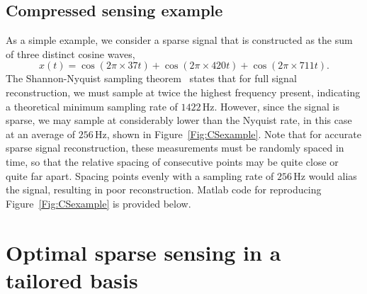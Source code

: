 \documentclass[letterpaper]{IEEEtran}
\begin{document}
\subsection[Compressed sensing example]{Compressed sensing example}
\label{sb:cs_example}
As a simple example, we consider a sparse signal that is constructed as the sum of three distinct cosine waves,
%
\begin{equation}
x(t) = \cos(2\pi\times 37 t) +  \cos(2\pi\times 420 t) +  \cos(2\pi\times 711 t). 
\end{equation}
%
The Shannon-Nyquist sampling theorem~\cite{Nyquist1928taiee,Shannon1948bstj} states that for full signal reconstruction, we must sample at twice the highest frequency present, indicating a theoretical minimum sampling rate of $1422\,$Hz.  
However, since the signal is sparse, we may sample at considerably lower than the Nyquist rate, in this case at an average of $256\,$Hz, shown in Figure~\ref{Fig:CSexample}.
%  
Note that for accurate sparse signal reconstruction, these measurements must be randomly spaced in time, so that the relative spacing of consecutive points may be quite close or quite far apart.  
Spacing points evenly with a sampling rate of $256\,$Hz would alias the signal, resulting in poor reconstruction. Matlab code for reproducing Figure~\ref{Fig:CSexample} is provided below.



\section{Optimal sparse sensing in a tailored basis}\label{Sec:Tailored}
\end{document}
